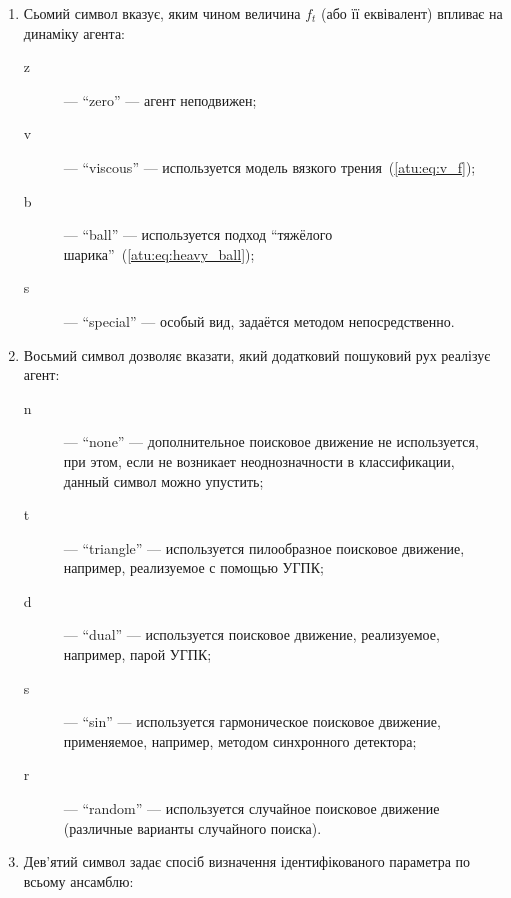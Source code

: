 \begin{enumerate}
\begin{description}
    \end{description}

  \item
    Сьомий символ
    вказує, яким чином величина $f_t$ (або її еквівалент) впливає на динаміку агента:
    \begin{description}

      \item[z]  --- ``zero'' ---
        агент неподвижен;

      \item[v] --- ``viscous'' ---
        используется модель вязкого трения~(\ref{atu:eq:v_f});

      \item[b] --- ``ball'' ---
        используется подход ``тяжёлого шарика''~(\ref{atu:eq:heavy_ball});

      \item[s] --- ``special'' ---
        особый вид, задаётся методом непосредственно.

    \end{description}

  \item
    Восьмий символ дозволяє вказати,
    який додатковий пошуковий рух реалізує агент:
    \begin{description}

      \item[n]  --- ``none'' ---
        дополнительное поисковое движение не используется,
        при этом, если не возникает неоднозначности в классификации, данный символ можно упустить;

      \item[t] --- ``triangle'' ---
        используется пилообразное поисковое движение, например, реализуемое с помощью УГПК;

      \item[d] --- ``dual'' ---
        используется поисковое движение, реализуемое, например, парой УГПК;

      \item[s] --- ``sin'' ---
        используется гармоническое поисковое движение, применяемое, например, методом синхронного детектора;

      \item[r] --- ``random'' ---
        используется случайное поисковое движение (различные варианты случайного поиска).

    \end{description}


  \item
     Дев'ятий символ задає спосіб визначення ідентифікованого параметра по всьому ансамблю:
    \begin{description}


\end{description}
\end{enumerate}
